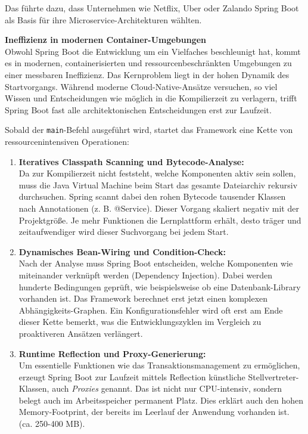 Das führte dazu, dass Unternehmen wie Netflix, Uber oder Zalando Spring Boot als Basis für ihre Microservice-Architekturen wählten. 

\vspace{0.7cm}
\textbf{Ineffizienz in modernen Container-Umgebungen} \cite{MediumQuarkusVsSpringBoot} \\
Obwohl Spring Boot die Entwicklung um ein Vielfaches beschleunigt hat, kommt es in modernen, containerisierten und ressourcenbeschränkten Umgebungen zu einer messbaren Ineffizienz. Das Kernproblem liegt in der hohen Dynamik des Startvorgangs. Während moderne Cloud-Native-Ansätze versuchen, so viel Wissen und Entscheidungen wie möglich in die Kompilierzeit zu verlagern, trifft Spring Boot fast alle architektonischen Entscheidungen erst zur Laufzeit.

Sobald der \texttt{main}-Befehl ausgeführt wird, startet das Framework eine Kette von ressourcenintensiven Operationen:
\begin{enumerate}
	\item \textbf{Iteratives Classpath Scanning und Bytecode-Analyse:} \\
	Da zur Kompilierzeit nicht feststeht, welche Komponenten aktiv sein sollen, muss die Java Virtual Machine beim Start das gesamte Dateiarchiv rekursiv durchsuchen. Spring scannt dabei den rohen Bytecode tausender Klassen nach Annotationen (z. B. @Service). Dieser Vorgang skaliert negativ mit der Projektgröße. Je mehr Funktionen die Lernplattform erhält, desto träger und zeitaufwendiger wird dieser Suchvorgang bei jedem Start.
	
	\item \textbf{Dynamisches Bean-Wiring und Condition-Check:} \\
	Nach der Analyse muss Spring Boot entscheiden, welche Komponenten wie miteinander verknüpft werden (Dependency Injection). Dabei werden hunderte Bedingungen geprüft, wie beispielsweise ob eine Datenbank-Library vorhanden ist. Das Framework berechnet erst jetzt einen komplexen Abhängigkeits-Graphen. Ein Konfigurationsfehler wird oft erst am Ende dieser Kette bemerkt, was die Entwicklungszyklen im Vergleich zu proaktiveren Ansätzen verlängert.
	
	\item \textbf{Runtime Reflection und Proxy-Generierung:} \\
	Um essentielle Funktionen wie das Transaktionsmanagement zu ermöglichen, erzeugt Spring Boot zur Laufzeit mittels Reflection künstliche Stellvertreter-Klassen, auch \textit{Proxies} genannt. Das ist nicht nur CPU-intensiv, sondern belegt auch im Arbeitsspeicher permanent Platz. Dies erklärt auch den hohen Memory-Footprint, der bereits im Leerlauf der Anwendung vorhanden ist. (ca. 250-400 MB).
\end{enumerate}


